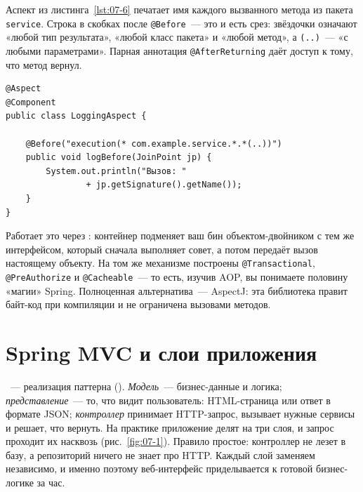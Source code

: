 Аспект из листинга~\ref{lst:07-6} печатает имя каждого вызванного метода из
пакета \texttt{service}. Строка в скобках после \texttt{@Before}~--- это и есть
срез: звёздочки означают «любой тип результата», «любой класс пакета» и «любой
метод», а \texttt{(..)}~--- «с любыми параметрами». Парная аннотация
\texttt{@AfterReturning} даёт доступ к тому, что метод вернул.

\begin{listing}[H]
\begin{verbatim}
@Aspect
@Component
public class LoggingAspect {

    @Before("execution(* com.example.service.*.*(..))")
    public void logBefore(JoinPoint jp) {
        System.out.println("Вызов: "
                + jp.getSignature().getName());
    }
}
\end{verbatim}
\caption{Аспект, логирующий вызовы сервисов}
\label{lst:07-6}
\end{listing}

Работает это через : контейнер подменяет ваш бин
объектом-двойником с тем же интерфейсом, который сначала выполняет совет, а
потом передаёт вызов настоящему объекту. На том же механизме построены
\texttt{@Transactional}, \texttt{@PreAuthorize} и \texttt{@Cacheable}~--- то
есть, изучив AOP, вы понимаете половину «магии» Spring. Полноценная
альтернатива~--- AspectJ: эта библиотека правит байт-код при компиляции и не
ограничена вызовами методов.

\section{Spring MVC и слои приложения}

~--- реализация паттерна  (). \emph{Модель}~---
бизнес-данные и логика; \emph{представление}~--- то, что видит пользователь:
HTML-страница или ответ в формате JSON; \emph{контроллер} принимает
HTTP-запрос, вызывает нужные сервисы и решает, что вернуть. На практике
приложение делят на три слоя, и запрос проходит их насквозь
(рис.~\ref{fig:07-1}). Правило простое: контроллер не лезет в базу, а
репозиторий ничего не знает про HTTP. Каждый слой заменяем независимо, и
именно поэтому веб-интерфейс приделывается к готовой бизнес-логике за час.

